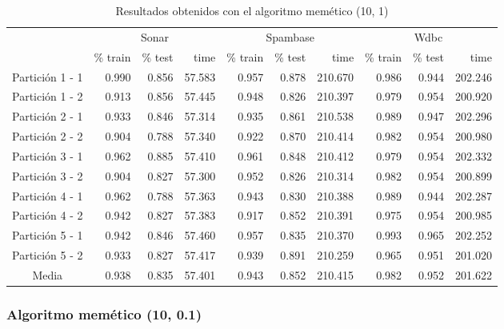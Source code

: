 \documentclass[11pt]{article}
\theoremstyle{plain}
\theoremstyle{definition}
\begin{document}
\begin{table}[H]
\centering
\caption{Resultados obtenidos con el algoritmo memético (10, 1)}
\label{tbl-ama}
\begin{tabular}{@{}crrrrrrrrr@{}}
  \toprule
  & \multicolumn{3}{c}{Sonar} & \multicolumn{3}{c}{Spambase} & \multicolumn{3}{c}{Wdbc}  \\
  \cmidrule(r){2-10}
           & \% train & \% test & time & \% train   & \% test   & time & \% train & \% test & time \\
  \midrule
Partición 1 - 1   & 0.990 & 0.856 & 57.583 & 0.957 & 0.878 & 210.670 & 0.986 & 0.944 & 202.246 \\
Partición 1 - 2   & 0.913 & 0.856 & 57.445 & 0.948 & 0.826 & 210.397 & 0.979 & 0.954 & 200.920 \\
Partición 2 - 1   & 0.933 & 0.846 & 57.314 & 0.935 & 0.861 & 210.538 & 0.989 & 0.947 & 202.296 \\
Partición 2 - 2   & 0.904 & 0.788 & 57.340 & 0.922 & 0.870 & 210.414 & 0.982 & 0.954 & 200.980 \\
Partición 3 - 1   & 0.962 & 0.885 & 57.410 & 0.961 & 0.848 & 210.412 & 0.979 & 0.954 & 202.332 \\
Partición 3 - 2   & 0.904 & 0.827 & 57.300 & 0.952 & 0.826 & 210.314 & 0.982 & 0.954 & 200.899 \\
Partición 4 - 1   & 0.962 & 0.788 & 57.363 & 0.943 & 0.830 & 210.388 & 0.989 & 0.944 & 202.287 \\
Partición 4 - 2   & 0.942 & 0.827 & 57.383 & 0.917 & 0.852 & 210.391 & 0.975 & 0.954 & 200.985 \\
Partición 5 - 1   & 0.942 & 0.846 & 57.460 & 0.957 & 0.835 & 210.370 & 0.993 & 0.965 & 202.252 \\
Partición 5 - 2   & 0.933 & 0.827 & 57.417 & 0.939 & 0.891 & 210.259 & 0.965 & 0.951 & 201.020 \\
  \bottomrule
Media             & 0.938 & 0.835 & 57.401 & 0.943 & 0.852 & 210.415 & 0.982 & 0.952 & 201.622 \\
\end{tabular}
\end{table}

\subsubsection{Algoritmo memético (10, 0.1)}
\end{document}
